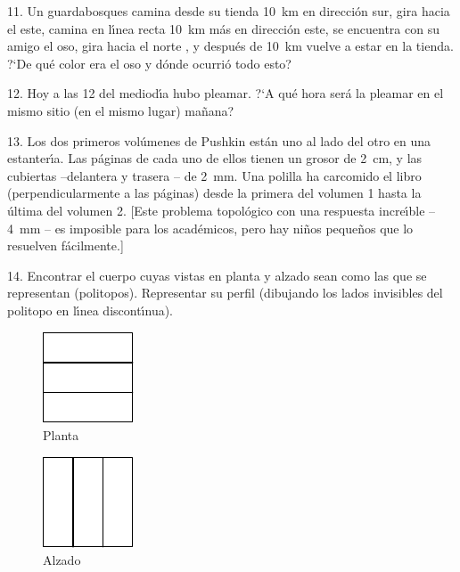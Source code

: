 \begin{problem}{11.}
	Un guardabosques camina desde su tienda \SI{10}{\km} en direcci\'on sur, gira hacia el este, camina en l\'{\i}nea recta
	\SI{10}{\km} m\'as en direcci\'on este, se encuentra con su amigo el oso, gira hacia el norte , y despu\'es de \SI{10}{\km} vuelve a
	estar en la tienda. ?`De qu\'e color era el oso y d\'onde ocurri\'o todo esto?
\end{problem}

\begin{problem}{12.}
	Hoy a las 12 del mediod\'{\i}a hubo pleamar. ?`A qu\'e hora ser\'a la pleamar en el mismo sitio (en el mismo lugar)
	ma\~nana?
\end{problem}

\begin{problem}{13.}
	Los dos primeros vol\'umenes de Pushkin est\'an uno al lado del otro en una estanter\'{\i}a. 
	Las p\'aginas de cada uno de ellos tienen un grosor de \SI{2}{\cm}, y las cubiertas --delantera y trasera 
	-- de \SI{2}{\mm}. Una polilla ha carcomido el libro (perpendicularmente a las p\'aginas) desde la primera del volumen 1 hasta
	la \'ultima del volumen 2.
	[Este problema topol\'ogico con una respuesta incre\'{\i}ble -- \SI{4}{\mm} -- es imposible para los acad\'emicos,
	pero hay ni\~nos peque\~nos que lo resuelven f\'acilmente.]  
\end{problem}

\begin{problem}{14.}
	Encontrar el cuerpo cuyas vistas en planta y alzado sean como las que se representan (politopos).
	Representar su perfil (dibujando los lados invisibles del politopo en l\'{\i}nea discont\'{\i}nua).
	\begin{figure}
		\footnotesize
		\null\hfill
		\parbox{0.2\linewidth}{\centering\includegraphics{resources/taskbook-99}\\Planta}
		\hfill
		\parbox{0.2\linewidth}{\centering\includegraphics{resources/taskbook-98}\\Alzado}
		\hfill\null
	\end{figure}
\end{problem}

